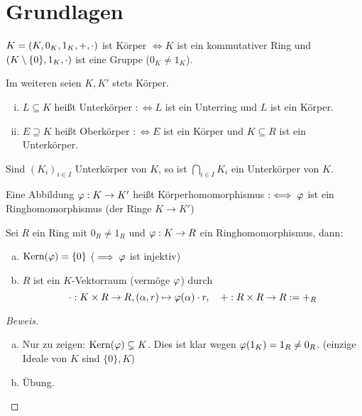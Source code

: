 \documentclass[a4paper]{report}
\begin{document}
\section{Grundlagen}%
\begin{defi*}[Körper]
$K = (K, 0_{K}, 1_{K}, +, \cdot)$ ist Körper $\iff K$ ist ein kommutativer Ring und $(K \setminus \{0\}, 1_{K}, \cdot)$ ist eine Gruppe ($0_{K} \ne 1_{K}$).
\end{defi*}
\begin{bem*}Im weiteren seien $K, K'$ stets Körper.

\end{bem*}

\begin{defi}
  \begin{enumerate}[(i)]
    \item $L \subseteq K$ heißt Unterkörper $:\iff L$ ist ein Unterring und $L$ ist ein Körper.
    \item $E \supseteq K$ heißt Oberkörper $:\iff E$ ist ein Körper und $K \subseteq R$ ist ein Unterkörper.
  \end{enumerate}
\end{defi}

\begin{bem}[Übung]
Sind $(K_{i})_{i \in I}$ Unterkörper von $K$, so ist $\bigcap_{i \in I}K_{i}$ ein Unterkörper von $K$.
\end{bem}

\begin{defi}[Körperhomomorphismus]
  Eine Abbildung $\varphi : K \to K'$ heißt Körperhomomorphismus $:\iff \varphi$ ist ein Ringhomomorphismus (der Ringe $K \to K'$)
\end{defi}

\begin{bem}
  Sei $R$ ein Ring mit $0_{R} \ne 1_{R}$ und $\varphi : K \to R$ ein Ringhomomorphismus, dann:
  \begin{enumerate}[(a)]
    \item $\operatorname{Kern}(\varphi) = \{0\}$  ($\implies \varphi$ ist injektiv)
    \item $R$ ist ein $K$-Vektorraum (vermöge $\varphi$) durch
          \[\cdot : K \times R \to R, (\alpha, r) \mapsto \varphi(\alpha) \cdot r,\quad +: R \times R \to R := +_{R}\]
  \end{enumerate}
\begin{proof}[Beweis]
  \begin{enumerate}[(a)]
          \item Nur zu zeigen: $\operatorname{Kern}(\varphi) \subsetneq K$. Dies ist klar wegen $\varphi(1_{K}) = 1_{R} \ne 0_{R}$. (einzige Ideale von $K$ sind $\{0\}, K$)
          \item Übung.\qedhere
\end{enumerate}
\end{proof}
\end{bem}
\end{document}
